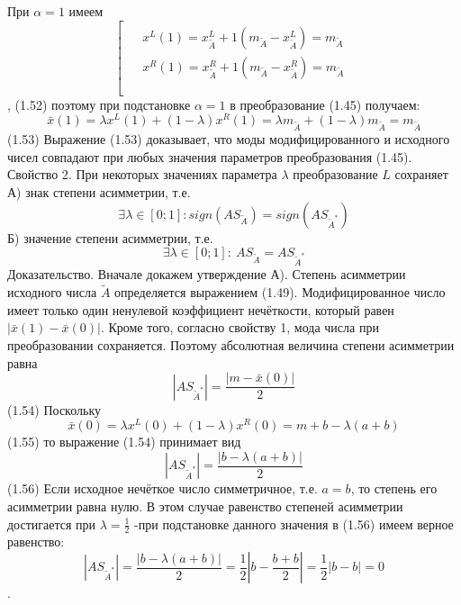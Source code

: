 При $\alpha =1$ имеем
	\[\left[ \begin{matrix}
   \begin{aligned}
  & {{x}^{L}}(1)=x_{{\tilde{A}}}^{L}+1\left( {{m}_{{\tilde{A}}}}-x_{{\tilde{A}}}^{L} \right)={{m}_{{\tilde{A}}}} \\ 
 & {{x}^{R}}(1)=x_{{\tilde{A}}}^{R}+1\left( {{m}_{{\tilde{A}}}}-x_{{\tilde{A}}}^{R} \right)={{m}_{{\tilde{A}}}} \\ 
\end{aligned}  \\
\end{matrix} \right.\],	(1.52)
поэтому при подстановке $\alpha =1$ в преобразование (1.45) получаем:
	\[\bar{x}\left( 1 \right)=\lambda {{x}^{L}}\left( 1 \right)+\left( 1-\lambda  \right){{x}^{R}}\left( 1 \right)=\lambda {{m}_{{\tilde{A}}}}+\left( 1-\lambda  \right){{m}_{{\tilde{A}}}}={{m}_{{\tilde{A}}}}\] 	(1.53)
Выражение (1.53) доказывает, что моды модифицированного и исходного чисел совпадают при любых значения параметров преобразования (1.45).
Свойство 2. При некоторых значениях параметра $\lambda $ преобразование $L$ сохраняет
А) знак степени асимметрии, т.е. \[\exists \lambda \in [0;1]:sign(A{{S}_{{\tilde{A}}}})=sign(A{{S}_{{{{\tilde{A}}}^{*}}}})\] 
Б) значение степени асимметрии, т.е. \[\exists \lambda \in [0;1]:\ A{{S}_{{\tilde{A}}}}=A{{S}_{{{{\tilde{A}}}^{*}}}}\] 
Доказательство. Вначале докажем утверждение А). Степень асимметрии исходного числа $\tilde{A}$ определяется выражением (1.49). Модифицированное число имеет только один ненулевой коэффициент нечёткости, который равен $\left| \bar{x}\left( 1 \right)-\bar{x}\left( 0 \right) \right|$. Кроме того, согласно свойству 1, мода числа при преобразовании сохраняется. Поэтому абсолютная величина степени асимметрии равна
	\[\left| A{{S}_{{{{\tilde{A}}}^{*}}}} \right|=\frac{\left| m-\bar{x}\left( 0 \right) \right|}{2}\] 	(1.54)
Поскольку
	\[\bar{x}\left( 0 \right)=\lambda {{x}^{L}}\left( 0 \right)+\left( 1-\lambda  \right){{x}^{R}}\left( 0 \right)=m+b-\lambda \left( a+b \right)\] 	(1.55)
то выражение (1.54) принимает вид
	\[\left| A{{S}_{{{{\tilde{A}}}^{*}}}} \right|=\frac{\left| b-\lambda \left( a+b \right) \right|}{2}\] 	(1.56)
Если исходное нечёткое число симметричное, т.е. $a=b$, то степень его асимметрии равна нулю. В этом случае равенство степеней асимметрии достигается при $\lambda =\frac{1}{2}$ -при подстановке данного значения в (1.56) имеем верное равенство:
	\[\left| A{{S}_{{{{\tilde{A}}}^{*}}}} \right|=\frac{\left| b-\lambda \left( a+b \right) \right|}{2}=\frac{1}{2}\left| b-\frac{b+b}{2} \right|=\frac{1}{2}\left| b-b \right|=0\].
